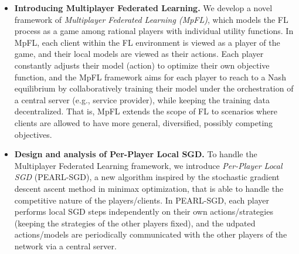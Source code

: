 \documentclass{article}
\newcommand{\algname}[1]{{\color{PineGreen}\sf  #1}\xspace}
\newcommand{\abbvname}{\algname{PEARL-SGD}}
\theoremstyle{plain}
\theoremstyle{remark}
\begin{document}
\begin{itemize}[leftmargin=*]
\setlength{\itemsep}{2pt}
    \item \textbf{Introducing Multiplayer Federated Learning.} We develop a novel framework of \emph{Multiplayer Federated Learning (MpFL)}, which models the FL process as a game among rational players with individual utility functions. In MpFL, each client within the FL environment is viewed as a player of the game, and their local models are viewed as their actions.
    Each player constantly adjusts their model (action) to optimize their own objective function, and the MpFL framework aims for each player to reach to a Nash equilibrium by collaboratively training their model under the orchestration of a central server (e.g., service provider), while keeping the training data decentralized. That is, MpFL extends the scope of FL to scenarios where clients are allowed to have more general, diversified, possibly competing objectives.
    
    \item \textbf{Design and analysis of Per-Player Local SGD.} To handle the Multiplayer Federated Learning framework, we introduce \emph{Per-Player Local SGD} (\abbvname), a new algorithm inspired by the stochastic gradient descent ascent method in minimax optimization, that is able to handle the competitive nature of the players/clients. In \abbvname, each player performs local SGD steps independently on their own actions/strategies (keeping the strategies of the other players fixed), and the udpated actions/models are periodically communicated with the other players of the network via a central server.
    

\end{itemize}
\end{document}
